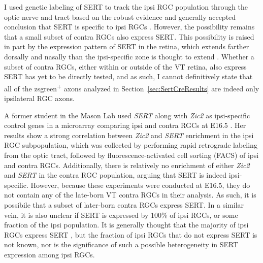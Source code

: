 \label{sec:TechnicalSERT}
I used genetic labeling of SERT to track the ipsi RGC population through the optic nerve and tract based on the robust evidence and generally accepted conclusion that SERT is specific to ipsi RGCs \cite{upton1999excess,garcia2010zic2,koch2011pathway}.
However, the possibility remains that a small subset of contra RGCs also express SERT.
This possibility is raised in part by the expression pattern of SERT in the retina, which extends farther dorsally and nasally than the ipsi-specific zone is thought to extend \cite{upton1999excess}.
Whether a subset of contra RGCs, either within or outside of the VT retina, also express SERT has yet to be directly tested, and as such, I cannot definitively state that all of the zsgreen\textsuperscript{+} axons analyzed in Section~\ref{sec:SertCreResults} are indeed only ipsilateral RGC axons.

A former student in the Mason Lab used \emph{SERT} along with \emph{Zic2} as ipsi-specific control genes in a microarray comparing ipsi and contra RGCs at E16.5 \cite{wang2016ipsilateral}.
Her results show a strong correlation between \emph{Zic2} and \emph{SERT} enrichment in the ipsi RGC subpopulation, which was collected by performing rapid retrograde labeling from the optic tract, followed by fluorescence-activated cell sorting (FACS) of ipsi and contra RGCs.
Additionally, there is relatively no enrichment of either \emph{Zic2} and \emph{SERT} in the contra RGC population, arguing that SERT is indeed ipsi-specific.
However, because these experiments were conducted at E16.5, they do not contain any of the late-born VT contra RGCs in their analysis.
As such, it is possibile that a subset of later-born contra RGCs express SERT.
In a similar vein, it is also unclear if SERT is expressed by 100\% of ipsi RGCs, or some fraction of the ipsi population.
It is generally thought that the majority of ipsi RGCs express SERT \cite{garcia2010zic2,koch2011pathway}, but the fraction of ipsi RGCs that do not express SERT is not known, nor is the significance of such a possible heterogeneity in SERT expression among ipsi RGCs.

